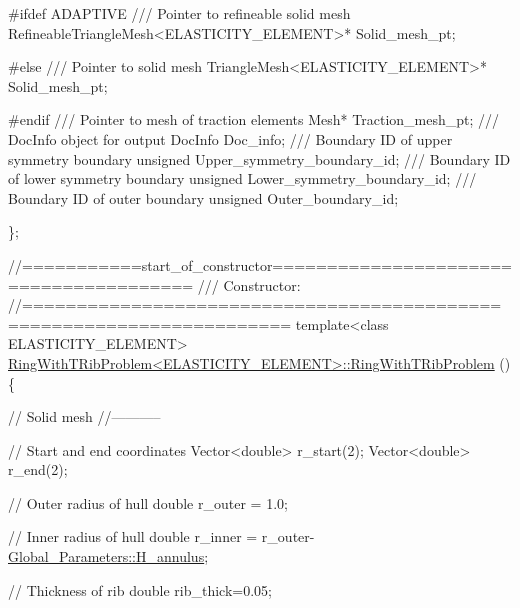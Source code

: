 \begin{DoxyCodeInclude}
\textcolor{preprocessor}{#ifdef ADAPTIVE}
\textcolor{comment}{}
\textcolor{comment}{ /// Pointer to refineable solid mesh}
\textcolor{comment}{} RefineableTriangleMesh<ELASTICITY\_ELEMENT>* Solid\_mesh\_pt;

\textcolor{preprocessor}{#else}
\textcolor{comment}{}
\textcolor{comment}{ /// Pointer to solid mesh}
\textcolor{comment}{} TriangleMesh<ELASTICITY\_ELEMENT>* Solid\_mesh\_pt;

\textcolor{preprocessor}{#endif}
\textcolor{comment}{}
\textcolor{comment}{ /// Pointer to mesh of traction elements}
\textcolor{comment}{} Mesh* Traction\_mesh\_pt;
\textcolor{comment}{}
\textcolor{comment}{ /// DocInfo object for output}
\textcolor{comment}{} DocInfo Doc\_info;
\textcolor{comment}{}
\textcolor{comment}{ /// Boundary ID of upper symmetry boundary}
\textcolor{comment}{} \textcolor{keywordtype}{unsigned} Upper\_symmetry\_boundary\_id;
\textcolor{comment}{}
\textcolor{comment}{ /// Boundary ID of lower symmetry boundary}
\textcolor{comment}{} \textcolor{keywordtype}{unsigned} Lower\_symmetry\_boundary\_id;
\textcolor{comment}{}
\textcolor{comment}{ /// Boundary ID of outer boundary}
\textcolor{comment}{} \textcolor{keywordtype}{unsigned} Outer\_boundary\_id;
 
\};


\textcolor{comment}{//===========start\_of\_constructor======================================= }\textcolor{comment}{}
\textcolor{comment}{/// Constructor: }
\textcolor{comment}{}\textcolor{comment}{//====================================================================== }
\textcolor{keyword}{template}<\textcolor{keyword}{class} ELASTICITY\_ELEMENT>
\hyperlink{classRingWithTRibProblem_ad0313aac3c0cdb87e753ba474a4e334f}{RingWithTRibProblem<ELASTICITY\_ELEMENT>::RingWithTRibProblem}
      () 
\{
 
 \textcolor{comment}{// Solid mesh}
 \textcolor{comment}{//-----------}

 \textcolor{comment}{// Start and end coordinates}
 Vector<double> r\_start(2);
 Vector<double> r\_end(2);
 
 \textcolor{comment}{// Outer radius of hull}
 \textcolor{keywordtype}{double} r\_outer = 1.0;

 \textcolor{comment}{// Inner radius of hull}
 \textcolor{keywordtype}{double} r\_inner = r\_outer-\hyperlink{namespaceGlobal__Parameters_a0b73c5ead1114ae88bbd4cb0eb54f078}{Global\_Parameters::H\_annulus};

 \textcolor{comment}{// Thickness of rib}
 \textcolor{keywordtype}{double} rib\_thick=0.05;
 

\end{DoxyCodeInclude}
